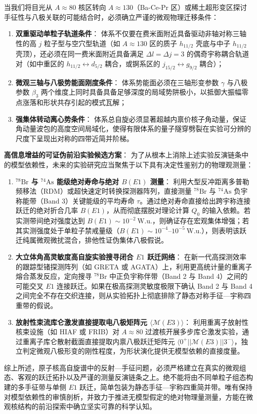 当我们将目光从 $A \approx 80$ 核区转向 $A \approx 130$（Ba-Ce-Pr 区）或稀土超形变区探讨手征性与八极关联的可能结合时，必须确立严谨的微观物理迁移条件：
\begin{enumerate}
\item \textbf{双重驱动单粒子轨道条件}：
体系不仅要在费米面附近具备驱动非轴对称三轴性的高 $j$ 粒子型与空穴型轨道（如 $A\approx 130$ 区的质子 $h_{11/2}$ 壳底与中子 $h_{11/2}$ 壳顶），还必须在同一费米面附近具备满足 $\Delta l = \Delta j = 3$ 的偶奇宇称耦合轨道对（如中重区的 $h_{11/2} \leftrightarrow d_{5/2}$ 耦合，或锕系区的 $j_{15/2} \leftrightarrow g_{9/2}$ 耦合）；
\item \textbf{微观三轴与八极势能面刚度条件}：
体系势能面必须在三轴形变参数 $\gamma$ 与八极参数 $\beta_3$ 两个维度上同时具备具备足够深度的局域势阱极小，以抵御大振幅零点涨落和形状共存引起的模式瓦解；
\item \textbf{强集体转动离心势条件}：
体系总自旋必须显著超越内禀价核子角动量，保证角动量波包的高度空间局域化，使得有限体系的量子隧穿劈裂在实验可分辨的尺度下呈现出对称的四带近简并阶梯。
\end{enumerate}

\textbf{高信息增益的可证伪前沿实验候选方案}：
为了从根本上消除上述实验反演链条中的模型依赖性，未来的实验研究应当聚焦于以下具有决定性鉴别力的物理观测量：
\begin{enumerate}
\item \textbf{$^{78}\mathrm{Br}$ 与 $^{74}\mathrm{As}$ 能级绝对寿命与绝对 $B(E1)$ 测量}：
利用大型反冲距离多普勒频移法（RDM）或超快速定时转换探测器阵列，直接测量 $^{78}\mathrm{Br}$ 与 $^{74}\mathrm{As}$ 负宇称能带（Band 3）关键能级的平均寿命 $\tau$。通过绝对寿命直接给出跨宇称连接跃迁的绝对折合几率 $B(E1)$，从而彻底摆脱对理论计算 $Q_0$ 的输入依赖。若实测带间绝对强度达到 $B(E1) \sim 10^{-2}\ \mathrm{W.u.}$，则确证存在宏观集体增强；若其实测强度处于单粒子禁戒量级（$B(E1) \sim 10^{-4}$--$10^{-5}\ \mathrm{W.u.}$），则表明该跃迁纯属微观微扰混合，排他性证伪集体八极假说。
\item \textbf{大立体角高灵敏度高自旋实验搜寻闭合 $E1$ 跃迁网络}：
在新一代高探测效率的跟踪型锗探测阵列（如 GRETA 或 AGATA）上，利用更高统计量的重离子熔合蒸发反应，定向搜寻 $^{78}\mathrm{Br}$ 中正负宇称伴带（Band 2 与 Band 4）之间的可能交叉 $E1$ 连接跃迁。如果在极高探测灵敏度极限下确认 Band 2 与 Band 4 之间完全不存在交织连接，则从实验拓扑上彻底排除了静态对称手征---宇称四重带的假说。
\item \textbf{放射性束流库仑激发直接提取电八极矩阵元 $\langle \mathcal{M}(E3) \rangle$}：
利用重离子放射性核束设施（如 HIAF 或 FRIB）对 $A\approx 80$ 过渡核开展多步库仑激发实验，通过重离子库仑散射截面直接提取内禀八极跃迁矩阵元 $\langle 0^+ || \mathcal{M}(E3) || 3^- \rangle$，独立判定微观八极形变的刚性程度，为形状演化提供无模型依赖的直接度量。
\end{enumerate}

综上所述，原子核高自旋谱中的反射---手征问题，必须严格建立在真实的微观组态、客观的跃迁拓扑以及严谨的测量反演链条之上。绝不能将由不同单粒子组态构建的多手征带与单侧 $E1$ 跃迁，简单包装为静态手征---宇称四重简并带。唯有保持对模型依赖性的审慎剖析，并致力于推进无模型假定的绝对物理量测量，方能在微观核结构的前沿探索中确立坚实可靠的科学认知。
